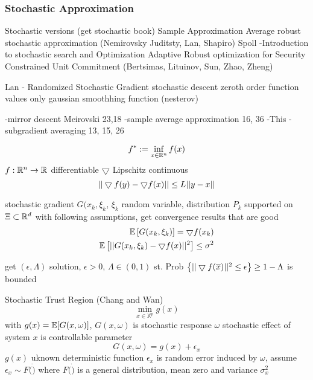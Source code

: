 \subsubsection{Stochastic Approximation}

Stochastic versions (get stochastic book)
Sample Approximation Average
robust stochastic approximation (Nemirovsky Juditsty, Lan, Shapiro)
Spoll  -Introduction to stochastic search and Optimization
Adaptive Robust optimization for Security Constrained Unit Commitment  (Bertsimas, Lituinov, Sun, Zhao, Zheng)


Lan -  Randomized Stochastic Gradient
stochastic descent
zeroth order function values only
gaussian smoothhing function  (nesterov)

-mirror descent Meirovski 23,18
-sample average approximation 16, 36
-This
-subgradient averaging 13, 15, 26

\begin{equation}
f^* := \inf_{x \in \mathbb{R}^{n}} f(x)
\end{equation}
$f: \mathbb{R}^{n} \rightarrow \mathbb{R}^{}$ differentiable
$\bigtriangledown$ Lipschitz continuous
\begin{equation}
|| \bigtriangledown f(y) - \bigtriangledown f (x) || \le L || y - x ||
\end{equation}

stochastic gradient
$G (x_k, \xi_k$, $\xi_k$ random variable, distribution $P_k$ supported on $\Xi \subset \mathbb{R}^{d}$
with following assumptions, get convergence results that are good
\begin{align}
\mathbb{E} \left[ G(x_k,\xi_k) \right] = \bigtriangledown f (x_k)		\\
\mathbb{E} \left[ || G(x_k,\xi_k) - \bigtriangledown f(x)||^2 \right] \le \sigma^2
\end{align}

get $(\epsilon, \Lambda)$ solution, $\epsilon > 0$, $\Lambda \in (0,1)$
st.
Prob $\left\{ || \bigtriangledown f(\overline{x}) ||^2 \le \epsilon \right\} \ge 1-\Lambda$
is bounded




Stochastic Trust Region	(Chang and Wan) \cite{chang_2009}
\begin{equation}
\min_{x \in \mathbb{X}^p} g(x)
\end{equation}
with $g(x) = \mathbb{E} [ G(x,\omega) ]$, 
$G(x, \omega)$ is stochastic response
$\omega$ stochastic effect of system
$x$ is controllable parameter
\begin{equation}
G(x, \omega) = g(x) + \epsilon_x
\end{equation}
$g(x)$ uknown deterministic function
$\epsilon_x$ is random error induced by $\omega$, assume $\epsilon_x \sim F( \dot )$ where 
$F( \dot )$ is a general distribution, mean zero and variance $\sigma_x^2$


